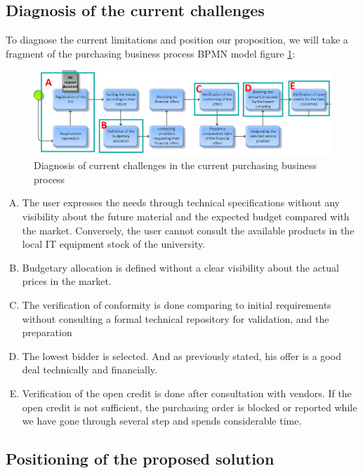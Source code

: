 \documentclass[preprint,3p,onecolumn]{elsarticle}
\begin{document}
\subsection{Diagnosis of the current challenges}
\par To diagnose the current limitations and position our proposition, we will take a fragment of the purchasing business process BPMN model figure \ref{giagnostic}:

\begin{figure}[H]
\centering
\includegraphics[scale=.3]{giagnostic}
\caption{Diagnosis of current challenges in the current purchasing business process}
\label{giagnostic}
\end{figure}

\begin{enumerate}[A.]
\item The user expresses the needs through technical specifications without any visibility about the future material and the expected budget compared with the market. Conversely, the user cannot consult the available products in the local IT equipment stock of the university. 
\item Budgetary allocation is defined without a clear visibility about the actual prices in the market.
\item The verification of conformity is done comparing to initial requirements without consulting a formal technical repository for validation, and the preparation
\item The lowest bidder is selected. And as previously stated, his offer is a good deal technically and financially. 
\item Verification of the open credit is done after consultation with vendors. If the open credit is not sufficient, the purchasing order is blocked or reported while we have gone through several step and spends considerable time.
\end{enumerate}
\subsection{Positioning of the proposed solution}
\end{document}

